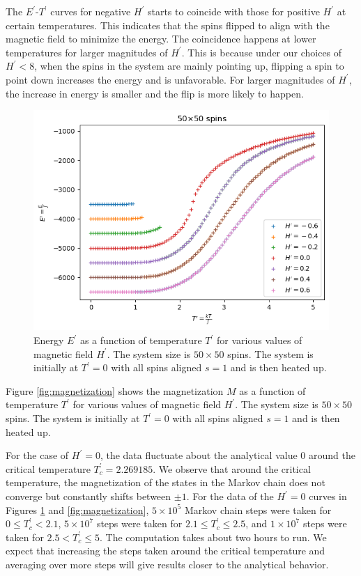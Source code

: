 \documentclass[11pt]{article}
\begin{document}
The $E^\prime$-$T^\prime$ curves for negative $H^\prime$ starts to coincide with those for positive $H^\prime$ at certain temperatures. This indicates that the spins flipped to align with the magnetic field to minimize the energy. The coincidence happens at lower temperatures for larger magnitudes of $H^\prime$. This is because under our choices of $H^\prime < 8$, when the spins in the system are mainly pointing up, flipping a spin to point down increases the energy and is unfavorable. For larger magnitudes of $H^\prime$, the increase in energy is smaller and the flip is more likely to happen.
\begin{figure}[H]
    \centering
    \includegraphics[scale = 0.7]{Figs_TW/energy_N50.png}
    \caption{Energy $E^\prime$ as a function of temperature $T^\prime$ for various values of magnetic field $H^\prime$. The system size is $50 \times 50$ spins. The system is initially at $T^\prime = 0$ with all spins aligned $s=1$ and is then heated up.}
    \label{fig:energy}
\end{figure}

Figure \ref{fig:magnetization} shows the magnetization $M$ as a function of temperature $T^\prime$ for various values of magnetic field $H^\prime$. The system size is $50 \times 50$ spins. The system is initially at $T^\prime = 0$ with all spins aligned $s=1$ and is then heated up.

For the case of $H^\prime = 0$, the data fluctuate about the analytical value 0 around the critical temperature $T^\prime_c = 2.269185$. We observe that around the critical temperature, the magnetization of the states in the Markov chain does not converge but constantly shifts between $\pm 1$. For the data of the $H^\prime = 0$ curves in Figures \ref{fig:energy} and \ref{fig:magnetization}, $5 \times 10^5$ Markov chain steps were taken for $0 \leq T_c^\prime < 2.1$, $5 \times 10^7$ steps were taken for $2.1 \leq T_c^\prime \leq 2.5$, and $1 \times 10^7$ steps were taken for $2.5 < T_c^\prime \leq 5$. The computation takes about two hours to run. We expect that increasing the steps taken around the critical temperature and averaging over more steps will give results closer to the analytical behavior.
\end{document}
